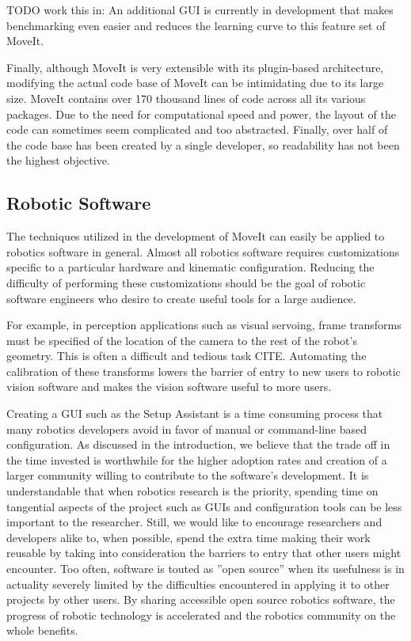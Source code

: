\documentclass[10pt,journal,compsoc]{joser1}
\begin{document}
{TODO work this in: An additional GUI is currently in development that makes benchmarking even easier and reduces the learning curve to this feature set of MoveIt.

Finally, although MoveIt is very extensible with its plugin-based architecture, modifying the actual code base of MoveIt can be intimidating due to its large size. MoveIt contains over 170 thousand lines of code across all its various packages. Due to the need for computational speed and power, the layout of the code can sometimes seem complicated and too abstracted. Finally, over half of the code base has been created by a single developer, so readability has not been the highest objective. 

\subsection{Robotic Software}
\label{sec::robotic_discussion}

The techniques utilized in the development of MoveIt can easily be applied to robotics software in general. Almost all robotics software requires customizations specific to a particular hardware and kinematic configuration. Reducing the difficulty of performing these customizations should be the goal of robotic software engineers who desire to create useful tools for a large audience. 

For example, in perception applications such as visual servoing, frame transforms must be specified of the location of the camera to the rest of the robot's geometry. This is often a difficult and tedious task CITE. Automating the calibration of these transforms lowers the barrier of entry to new users to robotic vision software and makes the vision software useful to more users.

Creating a GUI such as the Setup Assistant is a time consuming process that many robotics developers avoid in favor of manual or command-line based configuration. As discussed in the introduction, we believe that the trade off in the time invested is worthwhile for the higher adoption rates and creation of a larger community willing to contribute to the software's development. It is understandable that when robotics research is the priority, spending time on tangential aspects of the project such as GUIs and configuration tools can be less important to the researcher. Still, we would like to encourage researchers and developers alike to, when possible, spend the extra time making their work reusable by taking into consideration the barriers to entry that other users might encounter. Too often, software is touted as ''open source'' when its usefulness is in actuality severely limited by the difficulties encountered in applying it to other projects by other users. By sharing accessible open source robotics 
software, the progress of robotic technology is accelerated and the robotics community on the whole benefits.

}
\end{document}
